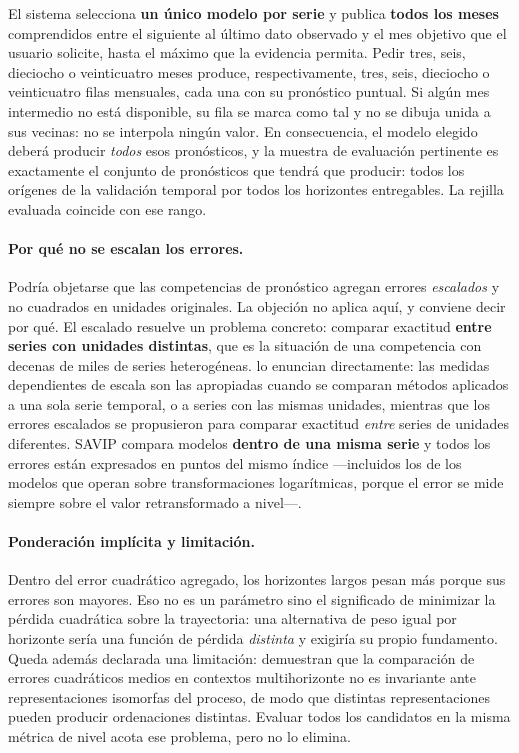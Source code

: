 \documentclass[12pt,letterpaper]{article}
\providecommand{\textcite}{\citet}
\begin{document}
El sistema selecciona \textbf{un único modelo por serie} y publica \textbf{todos los meses} comprendidos entre el siguiente al último dato observado y el mes objetivo que el usuario solicite, hasta el máximo que la evidencia permita. Pedir tres, seis, dieciocho o veinticuatro meses produce, respectivamente, tres, seis, dieciocho o veinticuatro filas mensuales, cada una con su pronóstico puntual. Si algún mes intermedio no está disponible, su fila se marca como tal y no se dibuja unida a sus vecinas: no se interpola ningún valor. En consecuencia, el modelo elegido deberá producir \emph{todos} esos pronósticos, y la muestra de evaluación pertinente es exactamente el conjunto de pronósticos que tendrá que producir: todos los orígenes de la validación temporal por todos los horizontes entregables. La rejilla evaluada coincide con ese rango.

\paragraph{Por qué no se escalan los errores.} Podría objetarse que las competencias de pronóstico agregan errores \emph{escalados} y no cuadrados en unidades originales. La objeción no aplica aquí, y conviene decir por qué. El escalado resuelve un problema concreto: comparar exactitud \textbf{entre series con unidades distintas}, que es la situación de una competencia con decenas de miles de series heterogéneas. \textcite{hyndman2021fpp3} lo enuncian directamente: las medidas dependientes de escala son las apropiadas cuando se comparan métodos aplicados a una sola serie temporal, o a series con las mismas unidades, mientras que los errores escalados se propusieron para comparar exactitud \emph{entre} series de unidades diferentes. SAVIP compara modelos \textbf{dentro de una misma serie} y todos los errores están expresados en puntos del mismo índice ---incluidos los de los modelos que operan sobre transformaciones logarítmicas, porque el error se mide siempre sobre el valor retransformado a nivel---.

\paragraph{Ponderación implícita y limitación.} Dentro del error cuadrático agregado, los horizontes largos pesan más porque sus errores son mayores. Eso no es un parámetro sino el significado de minimizar la pérdida cuadrática sobre la trayectoria: una alternativa de peso igual por horizonte sería una función de pérdida \emph{distinta} y exigiría su propio fundamento. Queda además declarada una limitación: \textcite{clements_hendry1993} demuestran que la comparación de errores cuadráticos medios en contextos multihorizonte no es invariante ante representaciones isomorfas del proceso, de modo que distintas representaciones pueden producir ordenaciones distintas. Evaluar todos los candidatos en la misma métrica de nivel acota ese problema, pero no lo elimina.
\end{document}
